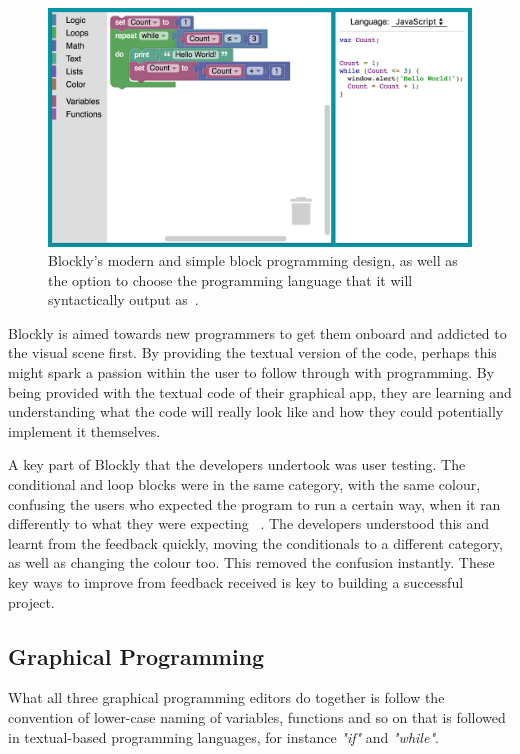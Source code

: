 \documentclass[a4paper, 12pt]{article}
\begin{document}
            \begin{figure}[h]
                \centering
                \includegraphics[width=150mm]{blockly.png}
                \caption{Blockly's modern and simple block programming design, as well 
                as the option to choose the programming language that it will syntactically 
                output as~\cite{blockly}.}
            \end{figure}

            Blockly is aimed towards new programmers to get them onboard and addicted to the visual 
            scene first. By providing the textual version of the code, perhaps this might spark a 
            passion within the user to follow through with programming. By being provided with the 
            textual code of their graphical app, they are learning and understanding what the code 
            will really look like and how they could potentially implement it themselves.

            A key part of Blockly that the developers undertook was user testing. The conditional and loop blocks were in the same category, with the same colour, 
            confusing the users who expected the program to run a certain way, when it ran differently 
            to what they were expecting ~\cite{fraser2015ten}. The developers understood this and 
            learnt from the feedback quickly, moving the conditionals to a different category, as 
            well as changing the colour too. This removed the confusion instantly. These key ways to improve 
            from feedback received is key to building a successful project.
        
        \clearpage
        \subsection{Graphical Programming}
            What all three graphical programming editors do together is follow the convention 
            of lower-case naming of variables, functions and so on that is followed in textual-based
            programming languages, for instance \textit{"if"} and \textit{"while"}. 
\end{document}
